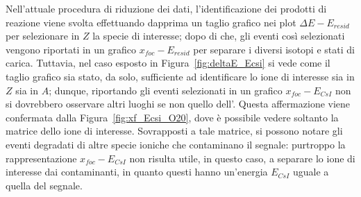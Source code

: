 Nell'attuale procedura di riduzione dei dati, l'identificazione dei prodotti di reazione viene svolta effettuando dapprima un taglio grafico nei plot $\Delta E - E_{resid}$ per selezionare in $Z$ la specie di interesse; dopo di che, gli eventi così selezionati vengono riportati in un grafico $x_{foc} - E_{resid}$ per separare i diversi isotopi e stati di carica. 
Tuttavia, nel caso esposto in Figura~\ref{fig:deltaE_Ecsi} si vede come il taglio grafico sia stato, da solo, sufficiente ad identificare lo ione di interesse sia in $Z$ sia in $A$; dunque, riportando gli eventi selezionati in un grafico $x_{foc} - E_{CsI}$ non si dovrebbero osservare altri luoghi se non quello dell'.
Questa affermazione viene confermata dalla Figura~\ref{fig:xf_Ecsi_O20}, dove è possibile vedere soltanto la matrice dello ione di interesse.
Sovrapposti a tale matrice, si possono notare gli eventi degradati di altre specie ioniche che contaminano il segnale: purtroppo la rappresentazione $x_{foc} - E_{CsI}$ non risulta utile, in questo caso, a separare lo ione di interesse dai contaminanti, in quanto questi hanno un'energia $E_{CsI}$ uguale a quella del segnale.


